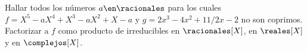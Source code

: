 \begin{enunciado}{\ejExtra} 
  Hallar todos los números $a \en \racionales$ para los cuales $f = X^5 - aX^4 + X^3 - aX^2 + X - a$
  y $g = 2x^3 - 4x^2 + 11/2x - 2$ no son coprimos. Factorizar a $f$ como producto de
  irreducibles en $\racionales[X]$, en $\reales[X]$ y en $\complejos[X]$.
\end{enunciado}

\hacer
